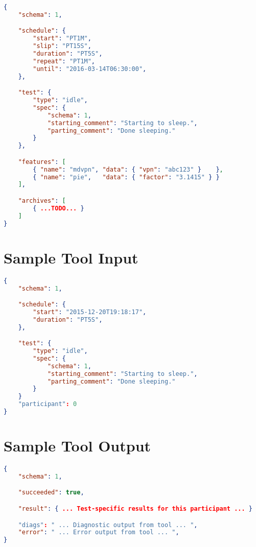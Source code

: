\documentclass[10pt]{article}
\begin{document}
\begin{lstlisting}[language=json,firstnumber=1]
{
    "schema": 1,

    "schedule": {
        "start": "PT1M",
        "slip": "PT15S",
        "duration": "PT5S",
        "repeat": "PT1M",
        "until": "2016-03-14T06:30:00",
    },

    "test": {
        "type": "idle",
        "spec": {
            "schema": 1,
            "starting_comment": "Starting to sleep.",
            "parting_comment": "Done sleeping."
        }
    },

    "features": [
        { "name": "mdvpn", "data": { "vpn": "abc123" }    },
        { "name": "pie",   "data": { "factor": "3.1415" } }
    ],

    "archives": [
        { ...TODO... }
    ]
}
\end{lstlisting}


\section{Sample Tool Input}

\begin{lstlisting}[language=json,firstnumber=1]
{
    "schema": 1,

    "schedule": {
        "start": "2015-12-20T19:18:17",
        "duration": "PT5S",
    },

    "test": {
        "type": "idle",
        "spec": {
            "schema": 1,
            "starting_comment": "Starting to sleep.",
            "parting_comment": "Done sleeping."
        }
    }
    "participant": 0
}
\end{lstlisting}



\section{Sample Tool Output}

\begin{lstlisting}[language=json,firstnumber=1]
{
    "schema": 1,

    "succeeded": true,

    "result": { ... Test-specific results for this participant ... }

    "diags": " ... Diagnostic output from tool ... ",
    "error": " ... Error output from tool ... ",
}

\end{lstlisting}
\end{document}
